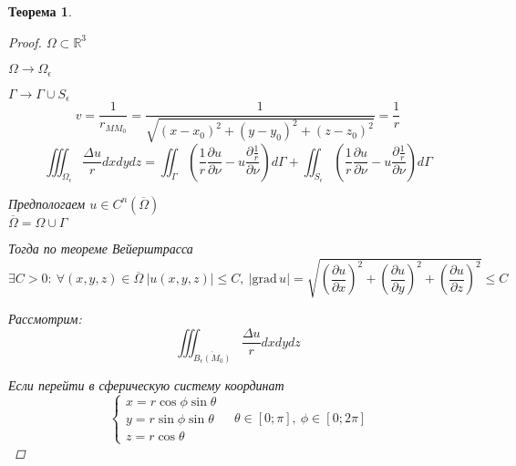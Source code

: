 \documentclass[a4paper]{article}
\newtheorem*{theorem}{Теорема}
\theoremstyle{definition}
\theoremstyle{remark}
\begin{document}
\begin{tcolorbox}
\begin{theorem}
    
    \begin{proof}
        $ \Omega \subset \mathbb{R}^3 $ 

          $ \Omega \to \Omega_{\epsilon} $ 

          $ \Gamma \to \Gamma \cup S_{\epsilon} $
          \[
              v = \frac{1}{r_{M M_0}} = \frac{1}{\sqrt{(x-x_0)^2 + (y-y_0)^2 +
              (z-z_0)^2}} = \frac{1}{r}
          \]
          \begin{equation}
              \iiint_{\Omega_{\epsilon}} \frac{\Delta u}{r} dxdydz 
              = \iint_{\Gamma} \left(\frac{1}{r} \frac{\partial u}{\partial \nu} - u 
              \frac{\partial \frac{1}{r} }{\partial \nu} \right) d \Gamma
              + \iint_{S_{\epsilon}} \left(\frac{1}{r} \frac{\partial u}{\partial \nu} - u 
              \frac{\partial \frac{1}{r} }{\partial \nu} \right) d \Gamma
          \end{equation}

          Предпологаем $ u \in C^n (\overline{\Omega}) $\\
          $ \overline{\Omega} = \Omega \cup \Gamma $ 

          Тогда по теореме Вейерштрасса
          \[
              \exists C > 0: \ \forall (x,y,z) \in \overline{\Omega} \  
              |u(x,y,z)| \leq C, \ |\text{grad}\, u| = 
              \sqrt{\left(\frac{\partial u}{\partial x}\right)^2 +
              \left(\frac{\partial u}{\partial y}\right)^2 +
              \left(\frac{\partial u}{\partial z}\right)^2} \leq C
          \]

          Рассмотрим:
          \[
              \iiint_{\overline{B_{\epsilon}(M_0)}} \frac{\Delta u}{r} dxdydz
          \]

          Если перейти в сферическую систему координат
          \[
              \begin{cases}
                  x = r \cos \phi \sin \theta\\
                  y = r \sin \phi \sin \theta\\
                  z = r \cos \theta
              \end{cases} \quad \theta \in [0;\pi], \ \phi \in [0; 2\pi]
          \]


\end{proof}
\end{theorem}
\end{tcolorbox}
\end{document}

